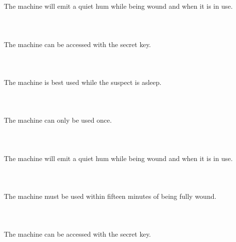 \documentclass{article}
\begin{document}
    \section{}
    The machine will emit a quiet hum while being wound and when it is in use.\\\\ 
    \newpage
    
    \section{}
    The machine can be accessed with the secret key.\\\\ 
    \newpage
    
    \section{}
    The machine is best used while the suspect is asleep.\\\\ 
    \newpage
    
    \section{}
    The machine can only be used once.\\\\ 
    \newpage
    
    \section{}
    The machine will emit a quiet hum while being wound and when it is in use.\\\\ 
    \newpage
    
    \section{}
    The machine must be used within fifteen minutes of being fully wound.\\\\ 
    \newpage
    
    \section{}
    The machine can be accessed with the secret key.\\\\ 
    \newpage
    
\end{document}

